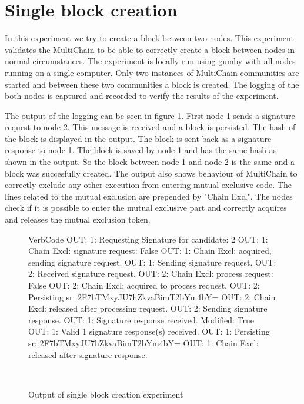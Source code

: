 \section{Single block creation}
In this experiment we try to create a block between two nodes.
This experiment validates the MultiChain to be able to correctly create a block between nodes in normal circumstances.
The experiment is locally run using gumby with all nodes running on a single computer.
Only two instances of MultiChain communities are started and between these two communities a block is created.
The logging of the both nodes is captured and recorded to verify the results of the experiment.

The output of the logging can be seen in figure \ref{fig:singleblockexperiment}.
First node 1 sends a signature request to node 2.
This message is received and a block is persisted.
The hash of the block is displayed in the output.
The block is sent back as a signature response to node 1.
The block is saved by node 1 and has the same hash as shown in the output.
So the block between node 1 and node 2 is the same and a block was succesfully created.
The output also shows behaviour of MultiChain
to correctly exclude any other execution from entering mutual exclusive code.
The lines related to the mutual exclusion are prepended by "Chain Excl".
The nodes check if it is possible to enter the mutual exclusive part and correctly acquires
and releases the mutual exclusion token.


\begin{figure}
    \begin{SaveVerbatim}{VerbCode}
OUT: 1: Requesting Signature for candidate: 2
OUT: 1: Chain Excl: signature request: False
OUT: 1: Chain Excl: acquired, sending signature request.
OUT: 1: Sending signature request.
OUT: 2: Received signature request.
OUT: 2: Chain Excl: process request: False
OUT: 2: Chain Excl: acquired to process request.
OUT: 2: Persisting sr: 2F7bTMxyJU7hZkvaBimT2bYm4bY=
OUT: 2: Chain Excl: released after processing request.
OUT: 2: Sending signature response.
OUT: 1: Signature response received. Modified: True
OUT: 1: Valid 1 signature response(s) received.
OUT: 1: Persisting sr: 2F7bTMxyJU7hZkvaBimT2bYm4bY=
OUT: 1: Chain Excl: released after signature response.
    \end{SaveVerbatim}
    \setlength{\fboxsep}{5mm}
    \caption{Output of single block creation experiment}~\label{fig:singleblockexperiment}
\end{figure}